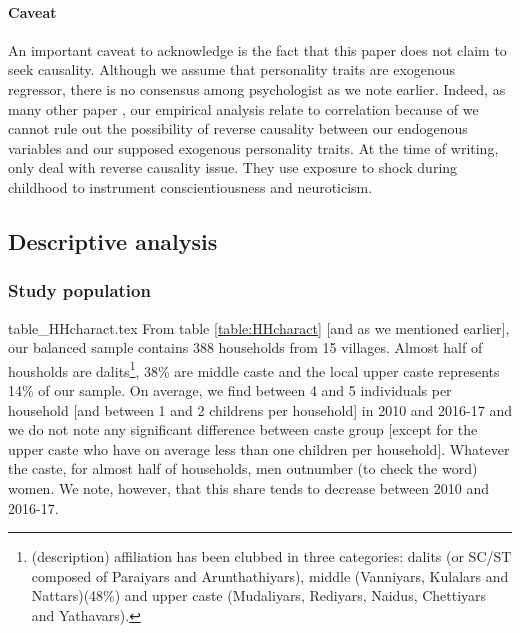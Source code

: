 \documentclass[a4paper, 11pt, onecolumn]{article}
\begin{document}
\paragraph{Caveat}
An important caveat to acknowledge is the fact that this paper does not claim to seek causality. 
Although we assume that personality traits are exogenous regressor, there is no consensus among psychologist as we note earlier.
Indeed, as many other paper \citep{Brown2014, Bucciol2017, Pinjisakikool2017a, Pinjisakikool2017b, CobbClark2016, Bertoni2019}, our empirical analysis relate to correlation because of we cannot rule out the possibility of reverse causality between our endogenous variables and our supposed exogenous personality traits.
At the time of writing, only \cite{Parise2019} deal with reverse causality issue.
They use exposure to shock during childhood to instrument conscientiousness and neuroticism.


	\subsection{Descriptive analysis}

		\subsubsection{Study population}
		
{table_HHcharact.tex}
From table \ref{table:HHcharact} [and as we mentioned earlier], our balanced sample contains 388 households from 15 villages.
Almost half of housholds are dalits\footnote{ (description) affiliation has been clubbed in three categories: dalits (or SC/ST composed of Paraiyars and Arunthathiyars), middle (Vanniyars, Kulalars and Nattars)(48\%) and upper caste (Mudaliyars, Rediyars, Naidus, Chettiyars and Yathavars).}, 38\% are middle caste and the local upper caste represents 14\%  of our sample.
On average, we find between 4 and 5 individuals per household [and between 1 and 2 childrens per household] in 2010 and 2016-17 and we do not note any significant difference between caste group [except for the upper caste who have on average less than one children per household].
Whatever the caste, for almost half of households, men outnumber (to check the word) women. 
We note, however, that this share tends to decrease between 2010 and 2016-17.
\end{document}
